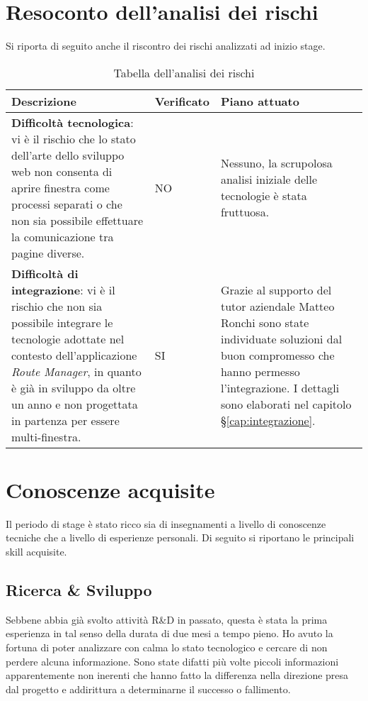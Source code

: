 \section{Resoconto dell'analisi dei rischi}

Si riporta di seguito anche il riscontro dei rischi analizzati ad inizio stage.

\begin{table}[H]
\small
\begin{tabular}{ |p{4.5cm} |p{1.75cm} |p{6.5cm}|}
\hline
\textbf{Descrizione} & \textbf{Verificato} & \textbf{Piano attuato} \\ \hline
\textbf{Difficoltà tecnologica}: vi è il rischio che lo stato dell'arte dello sviluppo web non consenta di aprire finestra come processi separati o che non sia possibile effettuare la comunicazione tra pagine diverse. & NO & Nessuno, la scrupolosa analisi iniziale delle tecnologie è stata fruttuosa. \\ \hline

\textbf{Difficoltà di integrazione}: vi è il rischio che non sia possibile integrare le tecnologie adottate nel contesto dell'applicazione \textit{Route Manager}, in quanto è già in sviluppo da oltre un anno e non progettata in partenza per essere multi-finestra. & SI & Grazie al supporto del tutor aziendale Matteo Ronchi sono state individuate soluzioni dal buon compromesso che hanno permesso l'integrazione. I dettagli sono elaborati nel capitolo §\ref{cap:integrazione}. \\ \hline
\end{tabular}
\caption{Tabella dell'analisi dei rischi}
\end{table}

\section{Conoscenze acquisite}

Il periodo di stage è stato ricco sia di insegnamenti a livello di conoscenze tecniche che a livello di esperienze personali. Di seguito si riportano le principali skill acquisite.

\subsection{Ricerca \& Sviluppo}

Sebbene abbia già svolto attività R\&D in passato, questa è stata la prima esperienza in tal senso della durata di due mesi a tempo pieno. Ho avuto la fortuna di poter analizzare con calma lo stato tecnologico e cercare di non perdere alcuna informazione. Sono state difatti più volte piccoli informazioni apparentemente non inerenti che hanno fatto la differenza nella direzione presa dal progetto e addirittura a determinarne il successo o fallimento. \\

